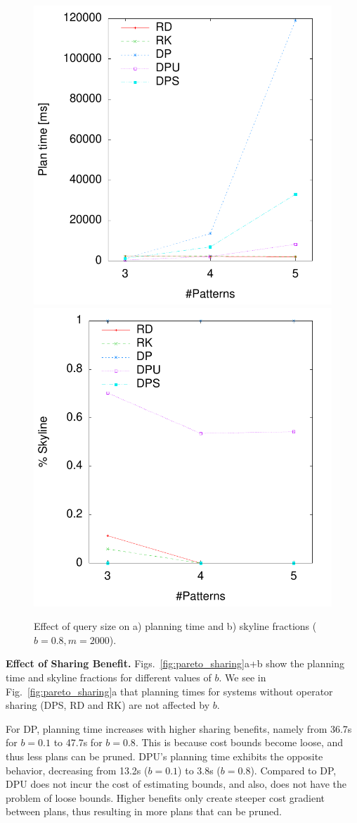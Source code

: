 \begin{figure}[htb]
  \centering
  \includegraphics[width=0.49\linewidth]{figs/pareto_plan_tp.pdf}
  \includegraphics[width=0.49\linewidth]{figs/plans_skyline_by_tp.pdf}
  \caption{Effect of query size on a) planning time and b) skyline
    fractions ($b=0.8, m=2000$).}
  \label{fig:pareto_tp}
\end{figure}

\textbf{Effect of Sharing Benefit.} Figs.~\ref{fig:pareto_sharing}a+b
show the planning time and skyline fractions for different values of $b$. We see in Fig.~\ref{fig:pareto_sharing}a that planning times for systems without operator sharing (DPS, RD and RK) are not affected by $b$. 

For DP, planning time increases with higher sharing
benefits, namely from 36.7s for $b=0.1$ to 47.7s for $b=0.8$.  This is because cost bounds
become loose, and thus less plans can be pruned. 
DPU's planning time exhibits the opposite behavior, decreasing from 13.2s ($b=0.1$) to 3.8s
($b=0.8$). Compared to DP, DPU does not incur the cost of estimating bounds, and also, does not have the problem of loose bounds. Higher benefits only create steeper cost gradient
between plans, thus resulting in more plans that can be pruned.

